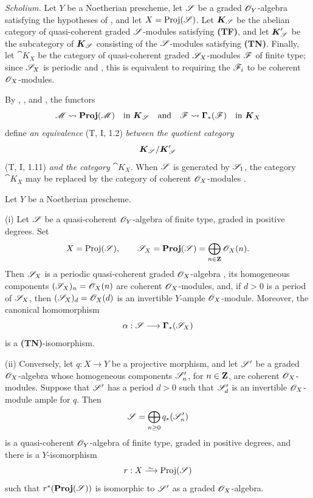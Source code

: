 \begin{env}[2.3.3]
\label{III.2.3.3}
\emph{Scholium.}
Let $Y$ be a Noetherian prescheme, let $\mathscr{S}$ be a graded $\mathscr{O}_Y$-algebra satisfying the hypotheses of , and let $X=\operatorname{Proj}(\mathscr{S})$.
Let $\boldsymbol{K}_{\mathscr{S}}$ be the abelian category of quasi-coherent graded $\mathscr{S}$-modules satisfying \textbf{(TF)}, and let $\boldsymbol{K}'_{\mathscr{S}}$ be the subcategory of $\boldsymbol{K}_{\mathscr{S}}$ consisting of the $\mathscr{S}$-modules satisfying \textbf{(TN)}.
Finally, let $\cat{K}_X$ be the category of quasi-coherent graded $\mathscr{S}_X$-modules $\mathscr{F}$ of finite type; since $\mathscr{S}_X$ is periodic  and , this is equivalent to requiring the $\mathscr{F}_i$ to be coherent $\mathscr{O}_X$-modules.

By , , and , the functors
\[
  \mathscr{M}\leadsto\operatorname{\mathbf{Proj}}(\mathscr{M})
  \quad\text{in }\boldsymbol{K}_{\mathscr{S}}
  \quad\text{and}\quad
  \mathscr{F}\leadsto\boldsymbol{\Gamma}_*(\mathscr{F})
  \quad\text{in }\boldsymbol{K}_X
\]
define \emph{an equivalence} (T, I, 1.2) \emph{between the quotient category}
\[
  \boldsymbol{K}_{\mathscr{S}}/\boldsymbol{K}'_{\mathscr{S}}
\]
(T, I, 1.11) \emph{and the category} $\cat{K}_X$.
When $\mathscr{S}$ is generated by $\mathscr{S}_1$, the category $\cat{K}_X$ may be replaced by the category of coherent $\mathscr{O}_X$-modules .
\end{env}

\begin{proposition}[2.3.4]
\label{III.2.3.4}
Let $Y$ be a Noetherian prescheme.

(i) Let $\mathscr{S}$ be a quasi-coherent $\mathscr{O}_Y$-algebra of finite type, graded in positive degrees.
Set
\[
  X=\operatorname{Proj}(\mathscr{S}),\qquad
  \mathscr{S}_X=\operatorname{\mathbf{Proj}}(\mathscr{S})
  =\bigoplus_{n\in\mathbf{Z}}\mathscr{O}_X(n).
\]
Then $\mathscr{S}_X$ is a periodic quasi-coherent graded $\mathscr{O}_X$-algebra , its homogeneous components $(\mathscr{S}_X)_n=\mathscr{O}_X(n)$
are coherent $\mathscr{O}_X$-modules, and, if $d>0$ is a period of $\mathscr{S}_X$, then $(\mathscr{S}_X)_d=\mathscr{O}_X(d)$
is an invertible $Y$-ample $\mathscr{O}_X$-module.
Moreover, the canonical homomorphism
\[
  \alpha:\mathscr{S}\longrightarrow\boldsymbol{\Gamma}_*(\mathscr{S}_X)
\]
is a \textup{\textbf{(TN)}}-isomorphism.

(ii) Conversely, let $q:X\to Y$ be a projective morphism, and let $\mathscr{S}'$ be a graded $\mathscr{O}_X$-algebra whose homogeneous components $\mathscr{S}'_n$, for $n\in\mathbf{Z}$, are coherent $\mathscr{O}_X$-modules.
Suppose that $\mathscr{S}'$ has a period $d>0$ such that $\mathscr{S}'_d$ is an invertible $\mathscr{O}_X$-module ample for $q$.
Then
\[
  \mathscr{S}=\bigoplus_{n\geq0}q_*(\mathscr{S}'_n)
\]
is a quasi-coherent $\mathscr{O}_Y$-algebra of finite type, graded in positive degrees, and there is a $Y$-isomorphism
\[
  r:X\simto\Proj(\sh{S})
\]
such that $r^*(\operatorname{\mathbf{Proj}}(\mathscr{S}))$ is isomorphic to $\mathscr{S}'$ as a graded $\mathscr{O}_X$-algebra.
\end{proposition}

